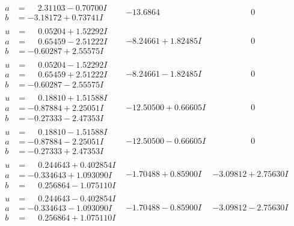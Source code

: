 \documentclass[1p]{elsarticle_modified}
\theoremstyle{definition}
\begin{document}
$$\begin{array}{c|c|c}
\begin{aligned}
a &= \phantom{-}2.31103 - 0.70700 I \\
b &= -3.18172 + 0.73741 I\end{aligned}
 & -13.6864\phantom{ +0.000000I} & \phantom{-0.000000 } 0 \\ \hline\begin{aligned}
u &= \phantom{-}0.05204 + 1.52292 I \\
a &= \phantom{-}0.65459 - 2.51222 I \\
b &= -0.60287 + 2.55575 I\end{aligned}
 & -8.24661 + 1.82485 I & \phantom{-0.000000 } 0 \\ \hline\begin{aligned}
u &= \phantom{-}0.05204 - 1.52292 I \\
a &= \phantom{-}0.65459 + 2.51222 I \\
b &= -0.60287 - 2.55575 I\end{aligned}
 & -8.24661 - 1.82485 I & \phantom{-0.000000 } 0 \\ \hline\begin{aligned}
u &= \phantom{-}0.18810 + 1.51588 I \\
a &= -0.87884 + 2.25051 I \\
b &= -0.27333 - 2.47353 I\end{aligned}
 & -12.50500 + 0.66605 I & \phantom{-0.000000 } 0 \\ \hline\begin{aligned}
u &= \phantom{-}0.18810 - 1.51588 I \\
a &= -0.87884 - 2.25051 I \\
b &= -0.27333 + 2.47353 I\end{aligned}
 & -12.50500 - 0.66605 I & \phantom{-0.000000 } 0 \\ \hline\begin{aligned}
u &= \phantom{-}0.244643 + 0.402854 I \\
a &= -0.334643 + 1.093090 I \\
b &= \phantom{-}0.256864 - 1.075110 I\end{aligned}
 & -1.70488 + 0.85900 I & -3.09812 + 2.75630 I \\ \hline\begin{aligned}
u &= \phantom{-}0.244643 - 0.402854 I \\
a &= -0.334643 - 1.093090 I \\
b &= \phantom{-}0.256864 + 1.075110 I\end{aligned}
 & -1.70488 - 0.85900 I & -3.09812 - 2.75630 I \\ \hline\begin{aligned}

\end{aligned}
\end{array}$$
\end{document}
